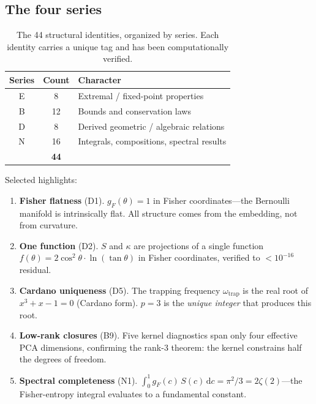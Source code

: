 \documentclass[
  aps,
  prd,
  twocolumn,
  superscriptaddress,
  nofootinbib,
  floatfix
]{revtex4-2}
\newcommand{\dd}{\mathrm{d}}
\newcommand{\gF}{g_{\!F}}
\begin{document}
\subsection{The four series}

\begin{table}[t]
\caption{\label{tab:identity-series}The 44 structural identities,
organized by series.  Each identity carries a unique tag and has
been computationally verified.}
\begin{ruledtabular}
\begin{tabular}{ccp{4.8cm}}
Series & Count & Character \\
\midrule
E & 8 & Extremal / fixed-point properties \\
B & 12 & Bounds and conservation laws \\
D & 8 & Derived geometric / algebraic relations \\
N & 16 & Integrals, compositions, spectral results \\
\midrule
 & \textbf{44} & \\
\end{tabular}
\end{ruledtabular}
\end{table}

\noindent Selected highlights:

\begin{enumerate}[leftmargin=*,label=(\alph*)]
\item \textbf{Fisher flatness} (D1).  $\gF(\theta) = 1$ in
  Fisher coordinates---the Bernoulli manifold is intrinsically flat.
  All structure comes from the embedding, not from curvature.

\item \textbf{One function} (D2).  $S$ and $\kappa$ are projections
  of a single function $f(\theta) = 2\cos^2\!\theta \cdot
  \ln(\tan\theta)$ in Fisher coordinates, verified to
  $< 10^{-16}$ residual.

\item \textbf{Cardano uniqueness} (D5).  The trapping frequency
  $\omega_{\mathrm{trap}}$ is the real root of
  $x^3 + x - 1 = 0$ (Cardano form).  $p = 3$ is the
  \emph{unique integer} that produces this root.

\item \textbf{Low-rank closures} (B9).  Five kernel diagnostics
  span only four effective PCA dimensions, confirming the rank-3
  theorem: the kernel constrains half the degrees of freedom.

\item \textbf{Spectral completeness} (N1).  $\int_0^1 \gF(c)\,S(c)\,
  \dd c = \pi^2/3 = 2\zeta(2)$---the Fisher-entropy integral
  evaluates to a fundamental constant.
\end{enumerate}
\end{document}
